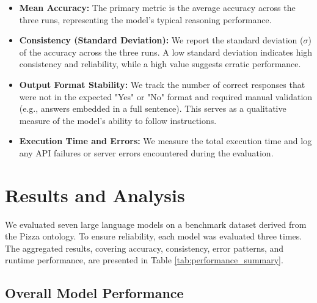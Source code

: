 \documentclass[11pt]{article}
\begin{document}
\begin{itemize}
    \item \textbf{Mean Accuracy:} The primary metric is the average accuracy across the three runs, representing the model's typical reasoning performance.
    
    \item \textbf{Consistency (Standard Deviation):} We report the standard deviation ($\sigma$) of the accuracy across the three runs. A low standard deviation indicates high consistency and reliability, while a high value suggests erratic performance.
    
    \item \textbf{Output Format Stability:} We track the number of correct responses that were not in the expected "Yes" or "No" format and required manual validation (e.g., answers embedded in a full sentence). This serves as a qualitative measure of the model's ability to follow instructions.
    
    \item \textbf{Execution Time and Errors:} We measure the total execution time and log any API failures or server errors encountered during the evaluation.
\end{itemize}

\newpage

\section{Results and Analysis}

We evaluated seven large language models on a benchmark dataset derived from the Pizza ontology. To ensure reliability, each model was evaluated three times. The aggregated results, covering accuracy, consistency, error patterns, and runtime performance, are presented in Table \ref{tab:performance_summary}.

\subsection{Overall Model Performance}
\end{document}
